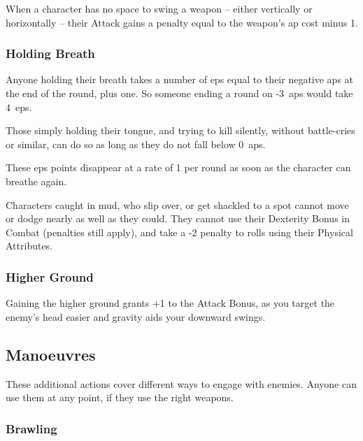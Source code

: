 \begin{multicols}{2}
When a character has no space to swing a weapon -- either vertically or horizontally -- their Attack gains a penalty equal to the weapon's \gls{ap} cost minus 1.

\subsubsection[Holding Breath: 1 \glsentrytext{ep} per negative \glsentrytext{ap} at the end of the round, plus 1~per round]{Holding Breath}
\label{holdingBreath}

Anyone holding their breath takes a number of \glspl{ep} equal to their negative \glspl{ap} at the end of the round, plus one.
So someone ending a round on -3~\glspl{ap} would take 4~\glspl{ep}.

Those simply holding their tongue, and trying to kill silently, without battle-cries or similar, can do so as long as they do not fall below 0~\glspl{ap}.

These \glspl{ep} points disappear at a rate of 1 per round as soon as the character can breathe again.

\label{trapped}
\label{prone}

Characters caught in mud, who slip over, or get shackled to a spot cannot move or dodge nearly as well as they could.
They cannot use their Dexterity Bonus in Combat (penalties still apply), and take a -2 penalty to rolls using their Physical Attributes.

\subsubsection[+1 to attack]{Higher Ground}

Gaining the higher ground grants +1 to the Attack Bonus, as you target the enemy's head easier and gravity aids your downward swings.

\subsection{Manoeuvres}

These additional actions cover different ways to engage with enemies.
Anyone can use them at any point, if they use the right weapons.

\subsubsection[Brawling: Make a normal attack roll, but any attack with a Margin less than 5 only inflicts \glspl{ep} rather than Damage]{Brawling}


\end{multicols}

